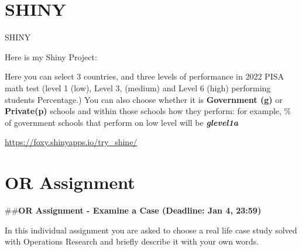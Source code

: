 \documentclass[
  letterpaper,
  DIV=11,
  numbers=noendperiod]{scrreprt}
\begin{document}

\hypertarget{shiny}{%
\chapter{SHINY}\label{shiny}}

SHINY

Here is my Shiny Project:

Here you can select 3 countries, and three levels of performance in 2022
PISA math test (level 1 (low), Level 3, (medium) and Level 6 (high)
performing students Percentage.) You can also choose whether it is
\textbf{Government (g)} or \textbf{Private(p)} schools and within those
schools how they perform: for example, \% of government schools that
perform on low level will be \textbf{\emph{glevel1a}}

\url{https://foxy.shinyapps.io/try_shine/}


\hypertarget{or-assignment}{%
\chapter{OR Assignment}\label{or-assignment}}

\#\#\textbf{OR Assignment - Examine a Case (Deadline: Jan 4, 23:59)}

In this individual assignment you are asked to choose a real life case
study solved with Operations Research and briefly describe it with your
own words.
\end{document}
